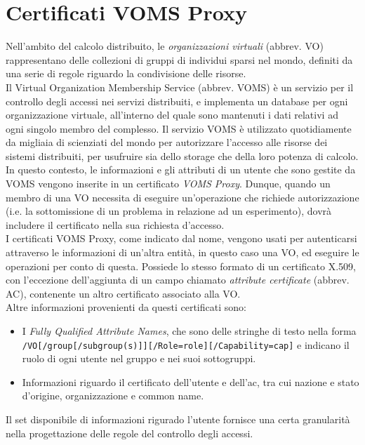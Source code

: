 \section{Certificati VOMS Proxy}
Nell'ambito del calcolo distribuito, le \textit{organizzazioni virtuali} (abbrev. VO) rappresentano delle collezioni di gruppi 
di individui sparsi nel mondo, definiti da una serie di regole riguardo la condivisione delle risorse. 
\\Il Virtual Organization Membership Service (abbrev. VOMS) è un servizio per il controllo degli accessi 
nei servizi distribuiti, e implementa
un database per ogni organizzazione virtuale, all'interno del
quale sono mantenuti i dati relativi ad ogni singolo membro del complesso. Il servizio VOMS è utilizzato quotidiamente da 
migliaia di scienziati del mondo per autorizzare l'accesso alle risorse dei sistemi distribuiti, per usufruire sia dello storage che della 
loro potenza di calcolo. 
\\ In questo contesto, le informazioni e gli attributi di un utente che sono gestite da VOMS vengono inserite in un certificato \textit{VOMS Proxy}.
Dunque, quando un membro di una VO necessita di eseguire un'operazione che richiede autorizzazione (i.e. la sottomissione di un problema in relazione ad un esperimento), 
dovrà includere il certificato nella sua richiesta d'accesso. 
\\ I certificati VOMS Proxy, come indicato dal nome, vengono usati per autenticarsi attraverso le informazioni di un'altra entità, in questo caso una VO, ed eseguire le operazioni
per conto di questa. Possiede lo stesso formato di un certificato X.509, con l'eccezione dell'aggiunta di un campo chiamato \textit{attribute certificate} (abbrev. AC),
 contenente un altro certificato associato alla VO. 
\\ Altre informazioni provenienti da questi certificati sono:
\begin{itemize}
    \item I \textit{Fully Qualified Attribute Names}, che sono delle stringhe di testo nella 
    forma \texttt{/VO[/group[/subgroup(s)]][/Role=role][/Capability=cap]} e indicano il ruolo di ogni utente nel gruppo e nei suoi sottogruppi. 
    \item Informazioni riguardo il certificato dell'utente e dell'ac, tra cui nazione e stato d'origine, organizzazione e common name.   
\end{itemize}
Il set disponibile di informazioni rigurado l'utente fornisce una certa granularità nella progettazione delle regole del controllo degli accessi. 

